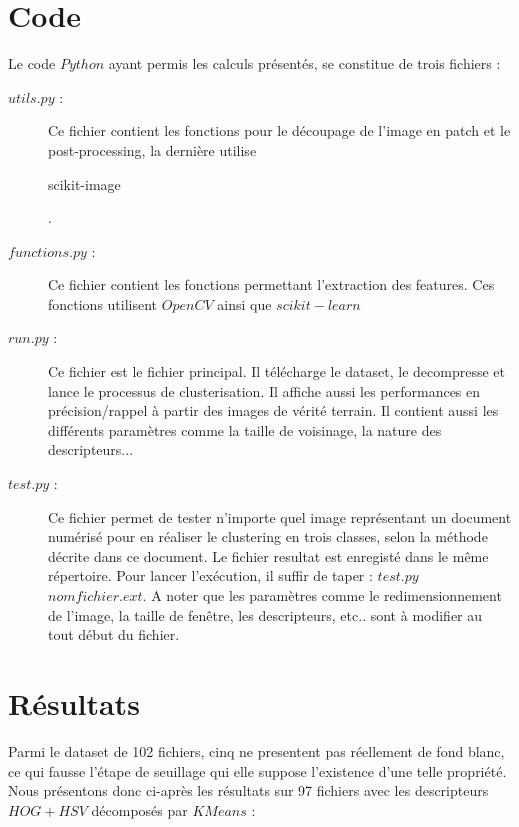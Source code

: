 \documentclass{book}
\begin{document}
\chapter{Code}

Le code $Python$ ayant permis les calculs présentés, se constitue de trois fichiers :
\begin{description} %

\item[$utils.py$ :] Ce fichier contient les fonctions pour le découpage de l'image en patch et le post-processing, la dernière utilise
\begin{itshape}scikit-image\end{itshape} \cite{scikit-image}.
\item[$functions.py$ :] Ce fichier contient les fonctions permettant l'extraction des features. Ces fonctions utilisent $OpenCV$ \cite{opencv_library} ainsi que $scikit-learn$ \cite{scikit-learn}
\item[$run.py$ :] Ce fichier est le fichier principal. Il télécharge le dataset, le decompresse et lance le processus de clusterisation. Il affiche aussi les performances
en précision/rappel à partir des images de vérité terrain. Il contient aussi les différents paramètres comme la taille de voisinage, la nature des descripteurs...
\item[$test.py$ :] Ce fichier permet de tester n'importe quel image représentant un document numérisé pour en réaliser le clustering 
en trois classes, selon la méthode décrite dans ce document. Le fichier resultat est enregisté dans le même répertoire. Pour lancer
l'exécution, il suffir de taper : $test.py$ $nomfichier.ext$. A noter que les paramètres comme le redimensionnement de l'image, la taille
de fenêtre, les descripteurs, etc.. sont à modifier au tout début du fichier.

\end{description}


\chapter{Résultats}

Parmi le dataset de 102 fichiers, cinq ne presentent pas réellement de fond blanc, ce qui fausse l'étape de seuillage qui elle suppose l'existence d'une telle
propriété.\\
Nous présentons donc ci-après les résultats sur 97 fichiers avec les descripteurs $HOG+HSV$ décomposés par $KMeans$ :\\
\end{document}
